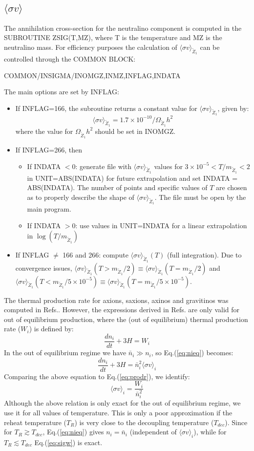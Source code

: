 \documentclass[preprint,notoc]{JHEP3}
\def\bi{\begin{itemize}}
\def\ei{\end{itemize}}
\def\tz{\widetilde Z}
\def\be{\begin{equation}}
\def\ee{\end{equation}}
\def\sigv{\langle \sigma v \rangle}
\begin{document}
\subsection{$\sigv$}
The annihilation cross-section for the neutralino component is computed in the SUBROUTINE ZSIG(T,MZ),
where T is the temperature and MZ is the neutralino mass. For efficiency purposes the calculation of
$\sigv_{\tz_1}$ can be controlled through the COMMON BLOCK:
\begin{center}
      COMMON/INSIGMA/INOMGZ,INMZ,INFLAG,INDATA
\end{center}
The main options are set by INFLAG:
\bi
\item If INFLAG=166, the subroutine returns a constant value for $\sigv_{\tz_1}$, given by:
\be
\sigv_{\tz_1} = 1.7\times 10^{-10}/\Omega_{\tz_1} h^2
\ee
where the value for $\Omega_{\tz_1} h^2$ should be set in INOMGZ.
\item If INFLAG=266, then
\bi
\item If INDATA $<0$: generate file with $\sigv_{\tz_1}$ values for $3\times 10^{-5} < T/m_{\tz_1} < 2$ in 
UNIT=ABS(INDATA) for future extrapolation and set INDATA = ABS(INDATA). The number of points and specific values
of $T$ are chosen as to properly describe the shape of $\sigv_{\tz_1}$. The file must be open by the
main program.
\item If INDATA $>0$: use values in UNIT=INDATA for a linear extrapolation in $\log(T/m_{\tz_1})$
\ei
\item If INFLAG $\neq$ 166 and 266: compute $\sigv_{\tz_1}(T)$ (full integration). Due to convergence issues,
$\sigv_{\tz_1}(T > m_{\tz_1}/2) \equiv \sigv_{\tz_1}(T=m_{\tz_1}/2)$ and $\sigv_{\tz_1}(T < m_{\tz_1}/5\times 10^{-5}) \equiv \sigv_{\tz_1}(T=m_{\tz_1}/5\times 10^{-5})$.
\ei

The thermal production rate for axions, saxions, axinos and gravitinos was computed in Refs.\cite{graff2,strumia,pradler}.
However, the expressions derived in Refs.\cite{graff2,strumia,pradler} are only valid for out of equilibrium production, where the
(out of equilibrium) thermal production rate ($W_i$) is defined by:
\be
\frac{d n_i}{dt} + 3 H = W_i \label{eq:prodr}
\ee
In the out of equilibrium regime we have $\bar{n}_i \gg n_i$, so Eq.(\ref{eq:nieq}) becomes:
\be
\frac{d n_i}{dt} + 3 H = \bar{n}_i^2 \sigv_i
\ee
Comparing the above equation to Eq.(\ref{eq:prodr}), we identify:
\be
\sigv_i = \frac{W_i}{\bar{n}_i^2} \label{eq:sigw}
\ee
Although the above relation is only exact for the out of equilibrium regime, we use it for all values of temperature.
This is only a poor approximation if the reheat temperature ($T_R$) is very close to the decoupling temperature ($T_{dec}$).
Since for $T_R \gtrsim T_{dec}$,  Eq.(\ref{eq:nieq}) gives $n_i = \bar{n}_i$ (independent of $\sigv_i$), while for $T_R \lesssim T_{dec}$ Eq.(\ref{eq:sigw}) is exact.
\end{document}
